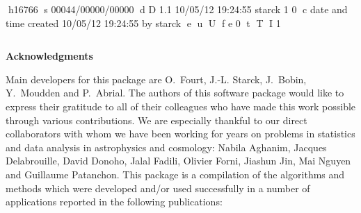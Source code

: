 h16766
s 00044/00000/00000
d D 1.1 10/05/12 19:24:55 starck 1 0
c date and time created 10/05/12 19:24:55 by starck
e
u
U
f e 0
t
T
I 1

\newpage
\thispagestyle{empty}
$ $
\newpage

{\Huge \bf Acknowledgments}\label{forewd}\\
\vspace{1cm}

Main developers for this package are  O.~Fourt, J.-L. Starck, J.~Bobin, Y.~Moudden and  P.~Abrial.
The authors of this software package would like to express their 
gratitude to all of their colleagues who have made this work  
possible through various contributions. 
We are especially thankful to our direct collaborators with whom we 
have been working for years on problems in statistics and data 
analysis in astrophysics and cosmology: Nabila Aghanim, Jacques Delabrouille, David Donoho, Jalal Fadili, 
Olivier Forni, Jiashun Jin, Mai Nguyen and Guillaume Patanchon.
This package is a compilation of the algorithms and methods which were 
developed and/or used successfully in a number of applications 
reported in the following publications: \\

